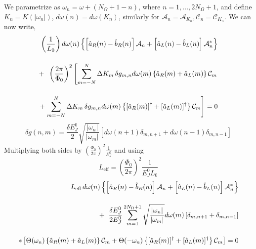 We parametrize as $\omega_n = \omega + (N_{\Omega} + 1 - n)$, where $n = 1, ..., 2N_{\Omega}+1$, and define $K_n = K(|\omega_n|)$, $d \omega (n) = d \omega(K_n)$, similarly for $\mathcal{A}_n = \mathcal{A}_{K_n}, \mathcal{C}_n = \mathcal{C}_{K_n}$. We can now write, 
%
\begin{equation}\label{eq:BC_discrete_1}
\begin{split}
    \left(\frac{1}{L_0}\right)
    d\omega(n)
    \left\lbrace
    \left[\hat{a}_R(n) - \hat{b}_R(n)\right]
    \mathcal{A}_n 
    +
    \left[\hat{a}_L(n) - \hat{b}_L(n)\right]
    \mathcal{A}^*_n
    \right\rbrace
    \\[4mm]
    +\hspace{2mm}
    \left(\frac{2\pi}{\Phi_0}\right)^2
    \left[
    \sum_{m=-N}^{N} \Delta K_m\,
    \delta g_{m, n}
    d \omega(m)
    \left\lbrace \hat{a}_R(m) + \hat{a}_L(m) \right\rbrace
    \mathcal{C}_m\right.
    \\[4mm]
    +
    \left.
    \sum_{m=-N}^{N} \Delta K_m\,
    \delta g_{m, n}
    d \omega(m)
    \left\lbrace [\hat{a}_R(m)]^\dagger + [\hat{a}_L(m)]^\dagger \right\rbrace
    \mathcal{C}_m
    \right]
    = 0
 \end{split}
\end{equation}
%
\begin{equation}
    \delta g(n,m)= 
    \frac{\delta E_J^0}{2}
    \sqrt{\frac{|\omega_n|}{|\omega_m|}}
    \left[ 
    d\omega (n+1) \delta_{m, n+1}
    + d\omega (n-1) \delta_{m, n-1}
    \right]
\end{equation}
%
Multiplying both sides by $\left(\frac{\Phi_0}{2\pi}\right)^2 \frac{1}{E_J^0}$ and using 
\begin{equation}
    L_{\text{eff}} = \left(\frac{\Phi_0}{2\pi}\right)^2 \frac{1}{E_J^0 L_0}
\end{equation}
%
\begin{equation}\label{eq:BC_discrete_2}
\begin{split}
    L_{\text{eff}}\, 
    d\omega(n)
    \left\lbrace
    \left[\hat{a}_R(n) - \hat{b}_R(n)\right]
    \mathcal{A}_n 
    +
    \left[\hat{a}_L(n) - \hat{b}_L(n)\right]
    \mathcal{A}^*_n
    \right\rbrace
    \\[4mm]
    +\hspace{2mm}
    \frac{\delta E_J^0}{2 E_J^0}
    \sum_{m=1}^{2N_{\Omega}+1}
    \sqrt{\frac{|\omega_n|}{|\omega_m|}}
    d \omega(m)
    \left[ 
    \delta_{m, n+1}
    + \delta_{m, n-1}
    \right]
    \\[4mm]
    *
    \left[
    \Theta(\omega_n)
    \left\lbrace \hat{a}_R(m) + \hat{a}_L(m) \right\rbrace
    \mathcal{C}_m
    +
    \Theta(-\omega_n)
    \left\lbrace [\hat{a}_R(m)]^\dagger + [\hat{a}_L(m)]^\dagger \right\rbrace
    \mathcal{C}_m
    \right]
    = 0
 \end{split}
\end{equation}